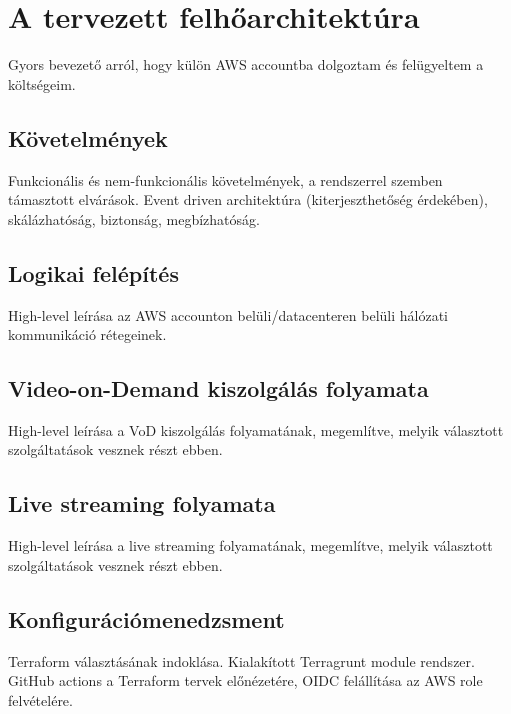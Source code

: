\chapter{A tervezett felhőarchitektúra}

Gyors bevezető arról, hogy külön AWS accountba dolgoztam és felügyeltem a költségeim.

\section{Követelmények}

Funkcionális és nem-funkcionális követelmények, a rendszerrel szemben támasztott elvárások. Event driven architektúra (kiterjeszthetőség érdekében), skálázhatóság, biztonság, megbízhatóság.

\section{Logikai felépítés}

High-level leírása az AWS accounton belüli/datacenteren belüli hálózati kommunikáció rétegeinek.

\section{Video-on-Demand kiszolgálás folyamata}

High-level leírása a VoD kiszolgálás folyamatának, megemlítve, melyik választott szolgáltatások vesznek részt ebben.

\section{Live streaming folyamata}

High-level leírása a live streaming folyamatának, megemlítve, melyik választott szolgáltatások vesznek részt ebben.

\section{Konfigurációmenedzsment}

Terraform választásának indoklása. Kialakított Terragrunt module rendszer. GitHub actions a Terraform tervek előnézetére, OIDC felállítása az AWS role felvételére.
